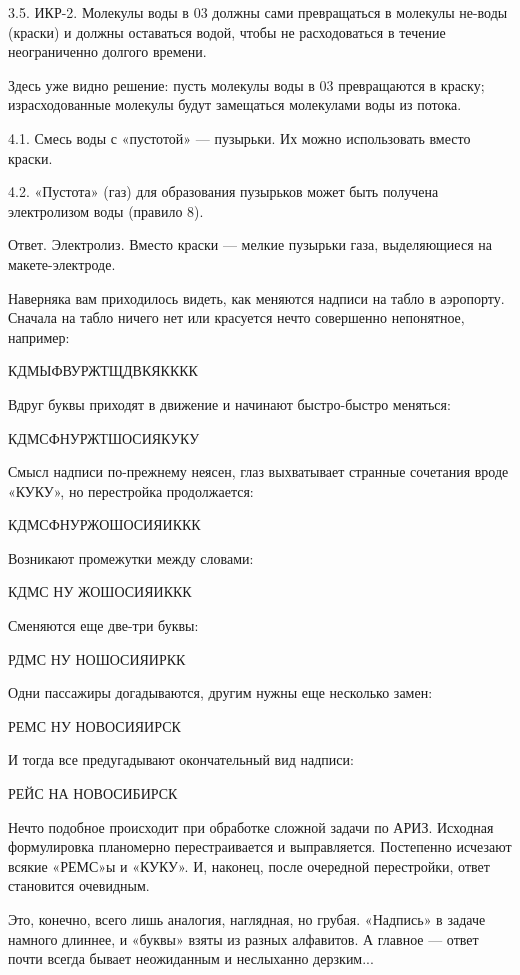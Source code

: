 3.5. ИКР-2.  Молекулы воды  в 03 должны  сами превращаться  в молекулы
не-воды (краски) и  должны оставаться водой, чтобы  не расходоваться в
течение неограниченно долгого времени.

Здесь  уже видно  решение: пусть  молекулы  воды в  03 превращаются  в
краску; израсходованные  молекулы будут замещаться молекулами  воды из
потока.

4.1. Смесь воды с «пустотой»  — пузырьки. Их можно использовать вместо
краски.

4.2.  «Пустота» (газ)  для образования  пузырьков может  быть получена
электролизом воды (правило 8).

Ответ. Электролиз. Вместо краски  — мелкие пузырьки газа, выделяющиеся
на макете-электроде.


Наверняка  вам приходилось  видеть, как  меняются надписи  на табло  в
аэропорту. Сначала на табло ничего  нет или красуется нечто совершенно
непонятное, например:

КДМЫФВУРЖТЩДВКЯКККК

Вдруг буквы приходят в движение и начинают быстро-быстро меняться:

КДМСФНУРЖТШОСИЯКУКУ

Смысл надписи по-прежнему неясен,  глаз выхватывает странные сочетания
вроде «КУКУ», но перестройка продолжается:

КДМСФНУРЖОШОСИЯИККК

Возникают промежутки между словами:

КДМС НУ ЖОШОСИЯИККК

Сменяются еще две-три буквы:

РДМС НУ НОШОСИЯИРКК

Одни пассажиры догадываются, другим нужны еще несколько замен:

РЕМС НУ НОВОСИЯИРСК

И тогда все предугадывают окончательный вид надписи:

РЕЙС НА НОВОСИБИРСК

Нечто  подобное  происходит  при  обработке сложной  задачи  по  АРИЗ.
Исходная  формулировка  планомерно   перестраивается  и  выправляется.
Постепенно  исчезают  всякие  «РЕМС»ы  и  «КУКУ».  И,  наконец,  после
очередной перестройки, ответ становится очевидным.

Это, конечно, всего  лишь аналогия, наглядная, но  грубая. «Надпись» в
задаче намного длиннее, и «буквы» взяты из разных алфавитов. А главное
— ответ почти всегда бывает неожиданным и неслыханно дерзким...


